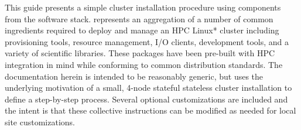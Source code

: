 This guide presents a simple cluster installation procedure using components
from the \OHPC{} software stack. \OHPC{} represents an aggregation of a number
of common ingredients required to deploy and manage an HPC Linux* cluster
including provisioning tools, resource management, I/O clients, development
tools, and a variety of scientific libraries. These packages have been
pre-built with HPC integration in mind while conforming to common \Linux{}
distribution standards.
The documentation herein is intended to
be reasonably generic, but uses the underlying motivation of a small, 4-node
 stateful \else stateless \fi
cluster installation to define a step-by-step process. Several
optional customizations are included and the intent is that these collective
instructions can be modified as needed for local site customizations.
